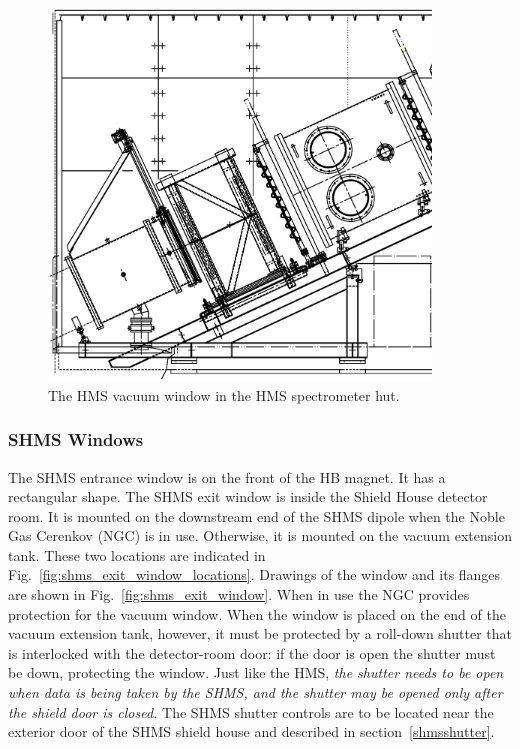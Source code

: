 \begin{figure}
\begin{center}
\includegraphics[width=4in]{figHMShut}
\caption{The HMS vacuum window in the HMS spectrometer hut. 
\label{fig:hms_window2}}
\end{center}
\end{figure}

\subsubsection{SHMS Windows}
\label{sec:shmswindows}
The SHMS entrance window is on the front of the HB magnet. It has a rectangular shape.
The SHMS exit window is inside the Shield House detector room. It is mounted on the 
downstream end of the SHMS dipole when the Noble Gas Cerenkov (NGC)
is in use. Otherwise, it is mounted on the vacuum extension tank.  These two locations
are indicated in Fig.~\ref{fig:shms_exit_window_locations}.  Drawings of
the window and its flanges are shown in Fig.~\ref{fig:shms_exit_window}. When in use
the NGC provides protection for the vacuum window. When the window is placed on
the end of the vacuum extension tank, however, it must be protected by a roll-down
shutter that is interlocked with the detector-room door: if the door is open the shutter
must be down, protecting the window. Just like the HMS, \emph{the shutter needs to be
open when data is being taken by the SHMS, and the shutter may be opened only
after the shield door is closed.} The SHMS shutter controls are to be located near the 
exterior door of the SHMS shield house and described in section~\ref{shmsshutter}.

